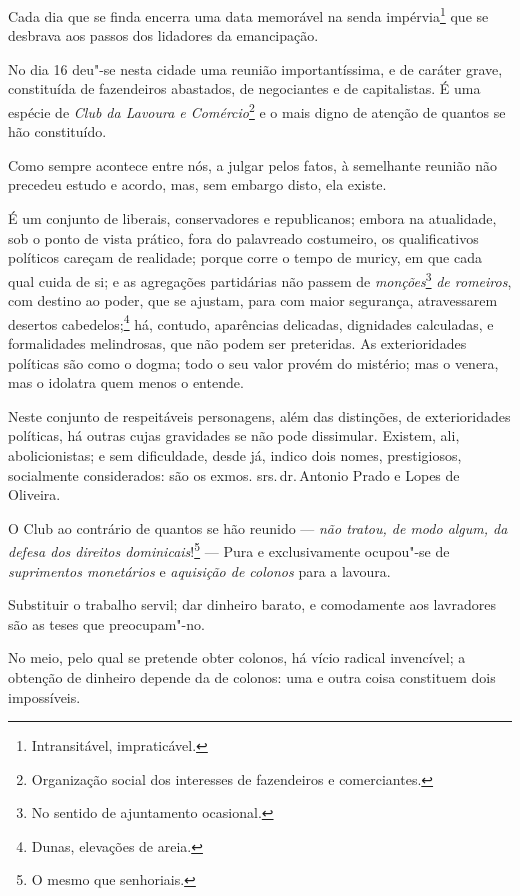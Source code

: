Cada dia que se finda encerra uma data memorável na senda
impérvia\footnote{Intransitável, impraticável.} que se desbrava aos
passos dos lidadores da emancipação.

No dia 16 deu"-se nesta cidade uma reunião importantíssima, e de caráter
grave, constituída de fazendeiros abastados, de negociantes e de
capitalistas. É uma espécie de \emph{Club da Lavoura e
Comércio}\footnote{Organização social dos interesses de fazendeiros e
  comerciantes.} e o mais digno de atenção de quantos se hão
constituído.

Como sempre acontece entre nós, a julgar pelos fatos, à semelhante
reunião não precedeu estudo e acordo, mas, sem embargo disto, ela
existe.

É um conjunto de liberais, conservadores e republicanos; embora na
atualidade, sob o ponto de vista prático, fora do palavreado costumeiro,
os qualificativos políticos careçam de realidade; porque corre o tempo
de muricy, em que cada qual cuida de si; e as agregações partidárias não
passem de \emph{monções}\footnote{No sentido de ajuntamento ocasional.}
\emph{de romeiros}, com destino ao poder, que se ajustam, para com maior
segurança, atravessarem desertos cabedelos;\footnote{Dunas, elevações
  de areia.} há, contudo, aparências delicadas, dignidades calculadas,
e formalidades melindrosas, que não podem ser preteridas. As
exterioridades políticas são como o dogma; todo o seu valor provém do
mistério; mas o venera, mas o idolatra quem menos o entende.

Neste conjunto de respeitáveis personagens, além das distinções, de
exterioridades políticas, há outras cujas gravidades se não pode
dissimular. Existem, ali, abolicionistas; e sem dificuldade, desde já,
indico dois nomes, prestigiosos, socialmente considerados: são os exmos.
srs.\,dr.\,Antonio Prado e Lopes de Oliveira.

O Club ao contrário de quantos se hão reunido --- \emph{não tratou, de
modo algum, da defesa dos direitos dominicais}!\footnote{O mesmo que
  senhoriais.} --- Pura e exclusivamente ocupou"-se de \emph{suprimentos
monetários} e \emph{aquisição de colonos} para a lavoura.

Substituir o trabalho servil; dar dinheiro barato, e comodamente aos
lavradores são as teses que preocupam"-no.

No meio, pelo qual se pretende obter colonos, há vício radical
invencível; a obtenção de dinheiro depende da de colonos: uma e outra
coisa constituem dois impossíveis.

